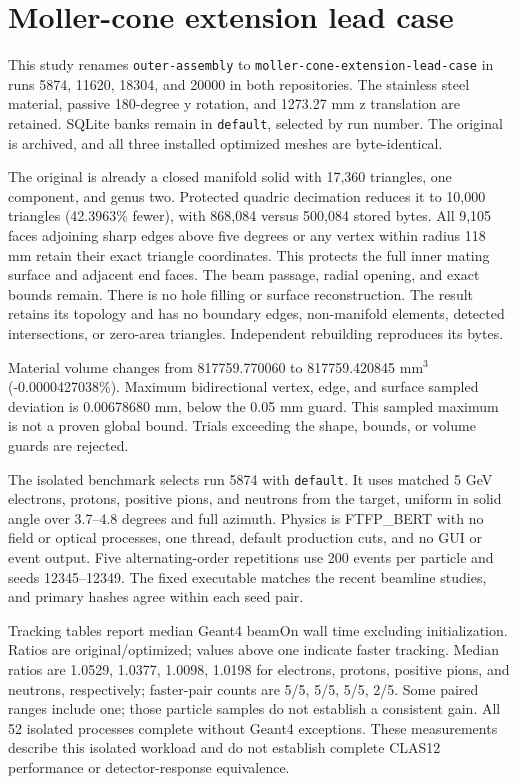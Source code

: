 \FloatBarrier
\section{Moller-cone extension lead case}
\label{sec:extension_case}

This study renames \texttt{outer-\allowbreak{}assembly} to
\texttt{moller-\allowbreak{}cone-\allowbreak{}extension-\allowbreak{}lead-\allowbreak{}case} in runs 5874,
11620, 18304, and 20000 in both repositories. The stainless steel material, passive 180-degree y rotation, and
1273.27 mm z translation are retained. SQLite banks remain in \texttt{default}, selected by run number. The
original is archived, and all three installed optimized meshes are byte-identical.

The original is already a closed manifold solid with 17,360 triangles, one component, and genus two. Protected
quadric decimation reduces it to 10,000 triangles (42.3963\% fewer), with 868,084 versus 500,084 stored bytes.
All 9,105 faces adjoining sharp edges above five degrees or any vertex within radius 118 mm retain their exact
triangle coordinates. This protects the full inner mating surface and adjacent end faces. The beam passage,
radial opening, and exact bounds remain. There is no hole filling or surface reconstruction. The result
retains its topology and has no boundary edges, non-manifold elements, detected intersections, or zero-area
triangles. Independent rebuilding reproduces its bytes.

Material volume changes from 817759.770060 to 817759.420845 mm$^3$ (-0.0000427038\%). Maximum bidirectional
vertex, edge, and surface sampled deviation is 0.00678680 mm, below the 0.05 mm guard. This sampled maximum is
not a proven global bound. Trials exceeding the shape, bounds, or volume guards are rejected.

The isolated benchmark selects run 5874 with \texttt{default}. It uses matched 5 GeV electrons, protons,
positive pions, and neutrons from the target, uniform in solid angle over 3.7--4.8 degrees and full azimuth.
Physics is FTFP\_BERT with no field or optical processes, one thread, default production cuts, and no GUI or
event output. Five alternating-order repetitions use 200 events per particle and seeds 12345--12349. The fixed
executable matches the recent beamline studies, and primary hashes agree within each seed pair.

Tracking tables report median Geant4 beamOn wall time excluding initialization. Ratios are original/optimized;
values above one indicate faster tracking. Median ratios are 1.0529, 1.0377, 1.0098, 1.0198 for electrons,
protons, positive pions, and neutrons, respectively; faster-pair counts are 5/5, 5/5, 5/5, 2/5. Some paired
ranges include one; those particle samples do not establish a consistent gain. All 52 isolated processes
complete without Geant4 exceptions. These measurements describe this isolated workload and do not establish
complete CLAS12 performance or detector-response equivalence.

